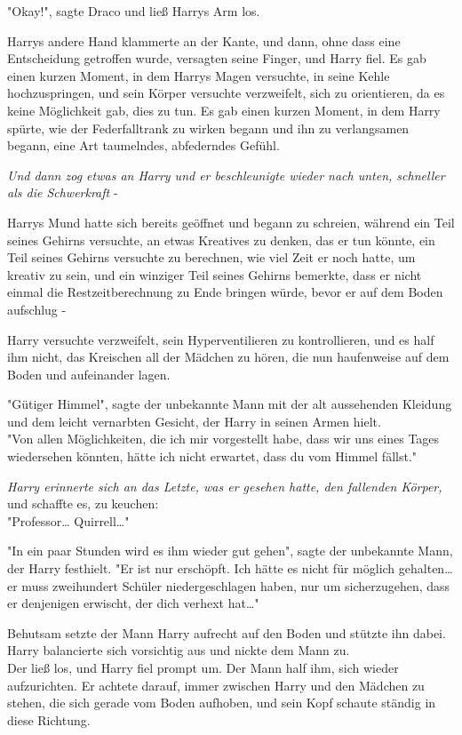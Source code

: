 {"Okay!", sagte Draco und ließ Harrys Arm los.

Harrys andere Hand klammerte an der Kante, und dann, ohne dass eine Entscheidung getroffen wurde, versagten seine Finger, und Harry fiel. Es gab einen kurzen Moment, in dem Harrys Magen versuchte, in seine Kehle hochzuspringen, und sein Körper versuchte verzweifelt, sich zu orientieren, da es keine Möglichkeit gab, dies zu tun. Es gab einen kurzen Moment, in dem Harry spürte, wie der Federfalltrank zu wirken begann und ihn zu verlangsamen begann, eine Art taumelndes, abfederndes Gefühl.

\emph{Und dann zog etwas an Harry und er beschleunigte wieder nach unten, schneller als die Schwerkraft} -

Harrys Mund hatte sich bereits geöffnet und begann zu schreien, während ein Teil seines Gehirns versuchte, an etwas Kreatives zu denken, das er tun könnte, ein Teil seines Gehirns versuchte zu berechnen, wie viel Zeit er noch hatte, um kreativ zu sein, und ein winziger Teil seines Gehirns bemerkte, dass er nicht einmal die Restzeitberechnung zu Ende bringen würde, bevor er auf dem Boden aufschlug -

Harry versuchte verzweifelt, sein Hyperventilieren zu kontrollieren, und es half ihm nicht, das Kreischen all der Mädchen zu hören, die nun haufenweise auf dem Boden und aufeinander lagen.

"Gütiger Himmel", sagte der unbekannte Mann mit der alt aussehenden Kleidung und dem leicht vernarbten Gesicht, der Harry in seinen Armen hielt.\\ "Von allen Möglichkeiten, die ich mir vorgestellt habe, dass wir uns eines Tages wiedersehen könnten, hätte ich nicht erwartet, dass du vom Himmel fällst."

\emph{Harry erinnerte sich an das Letzte, was er gesehen hatte, den fallenden Körper,} und schaffte es, zu keuchen:\\ "Professor… Quirrell…"

"In ein paar Stunden wird es ihm wieder gut gehen", sagte der unbekannte Mann, der Harry festhielt. "Er ist nur erschöpft. Ich hätte es nicht für möglich gehalten… er muss zweihundert Schüler niedergeschlagen haben, nur um sicherzugehen, dass er denjenigen erwischt, der dich verhext hat…"

Behutsam setzte der Mann Harry aufrecht auf den Boden und stützte ihn dabei. Harry balancierte sich vorsichtig aus und nickte dem Mann zu.\\ Der ließ los, und Harry fiel prompt um. Der Mann half ihm, sich wieder aufzurichten. Er achtete darauf, immer zwischen Harry und den Mädchen zu stehen, die sich gerade vom Boden aufhoben, und sein Kopf schaute ständig in diese Richtung.

}
